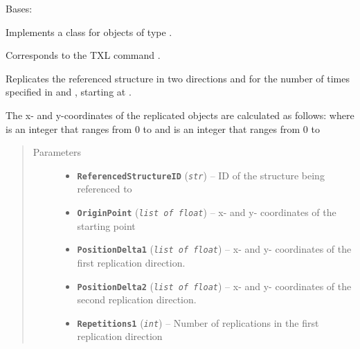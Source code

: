 \documentclass[letterpaper,10pt,english]{sphinxmanual}
\begin{document}
\begin{fulllineitems}
\label{Chapters/PythonModuleReference/Patterns/TXLWizard.Patterns.Array:TXLWizard.Patterns.Array.Array}
Bases: {\hyperref[Chapters/PythonModuleReference/Patterns/TXLWizard.Patterns.AbstractPattern:TXLWizard.Patterns.AbstractPattern.AbstractPattern]{}}

Implements a class for  objects of type .

Corresponds to the TXL command .

Replicates the referenced structure  in two directions  and 
for the number of times specified in  and ,
starting at .

The x- and y-coordinates of the replicated objects are calculated as follows:
where  is an integer that ranges from 0 to 
and  is an integer that ranges from 0 to 
\begin{quote}\begin{description}
\item[{Parameters}] \leavevmode\begin{itemize}
\item {} 
\textbf{\texttt{ReferencedStructureID}} (\emph{\texttt{str}}) -- ID of the structure being referenced to

\item {} 
\textbf{\texttt{OriginPoint}} (\emph{\texttt{list of float}}) -- x- and y- coordinates of the starting point

\item {} 
\textbf{\texttt{PositionDelta1}} (\emph{\texttt{list of float}}) -- x- and y- coordinates of the first replication direction.

\item {} 
\textbf{\texttt{PositionDelta2}} (\emph{\texttt{list of float}}) -- x- and y- coordinates of the second replication direction.

\item {} 
\textbf{\texttt{Repetitions1}} (\emph{\texttt{int}}) -- Number of replications in the first replication direction


\end{itemize}
\end{description}
\end{quote}
\end{fulllineitems}
\end{document}
